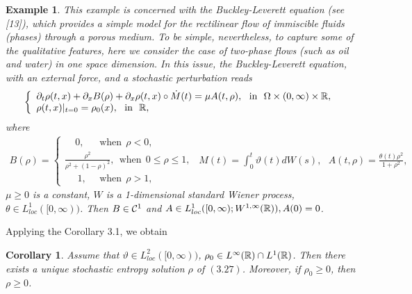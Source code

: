 \documentclass[11pt]{article}
\newtheorem{corollary}{Corollary}[section]
\newtheorem{example}{Example}[section]
\def\geq{\geqslant}\def\leq{\leqslant}
\begin{document}
\begin{example} This example is concerned with the
Buckley-Leverett equation (see [13]), which provides a simple model
for the rectilinear flow of immiscible fluids (phases) through a
porous medium. To be simple, nevertheless, to capture some of the
qualitative features, here we consider the case of two-phase flows
(such as oil and water) in one space dimension. In this issue, the
Buckley-Leverett equation, with an external force, and a stochastic
perturbation reads
\begin{eqnarray}\label{3.27}
\left\{
 \begin{array}{ll}
\partial_t\rho(t,x)+\partial_xB(\rho)+\partial_x\rho(t,x)\circ\dot{M}(t)
=\mu A(t,\rho), \ \ \mbox{in} \ \ \Omega\times(0,\infty) \times {\mathbb R}, \\
 \rho(t,x)|_{t=0}=\rho_0(x), \ \  \mbox{in} \ \ {\mathbb R},
  \end{array}
\right.
\end{eqnarray}
where
\begin{eqnarray*}
B(\rho)=\left\{
 \begin{array}{ll} \ \ \ \ \ 0, \ \ \ \ \ \  \ \mbox{when} \ \ \rho<0,
\\ \frac{\rho^2}{\rho^2+(1-\rho)^2}, \ \ \mbox{when} \ \
0\leq\rho\leq 1, \\  \ \ \ \  \ \  1,\ \ \ \ \ \  \mbox{when} \ \
\rho>1, \end{array} \right.
 \ \ M(t)=\int^t_0\vartheta(t)dW(s),\ \ \
A(t,\rho)=\frac{\theta(t)\rho^2}{1+\rho^2},
\end{eqnarray*}
$\mu\geq 0$ is a constant, $W$ is a 1-dimensional standard Wiener
process, $\theta\in L^1_{loc}([0,\infty))$. Then $B\in {\mathcal C}^1$ and
$A\in L^1_{loc}([0,\infty);W^{1,\infty}({\mathbb R})), A(0)=0$.
\end{example}
      \par
Applying the Corollary 3.1, we obtain
\begin{corollary} Assume that $\vartheta\in
L^2_{loc}([0,\infty))$, $\rho_0\in L^\infty({\mathbb R})\cap L^1({\mathbb R})$. Then
there exists a unique stochastic entropy solution $\rho$ of
$(3.27)$. Moreover, if $\rho_0\geq 0$, then $\rho\geq 0$.
\end{corollary}
\end{document}
